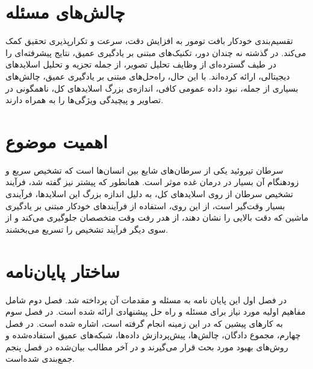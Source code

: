 \section{چالش‌های مسئله}\label{sec:چالش‌های مسئله}
تقسیم‌بندی خودکار بافت تومور به افزایش دقت، سرعت و تکرارپذیری تحقیق کمک می‌کند. در گذشته نه چندان دور، تکنیک‌های مبتنی بر یادگیری عمیق، نتایج پیشرفته‌ای را در طیف گسترده‌ای از وظایف تحلیل تصویر، از جمله تجزیه و تحلیل اسلایدهای دیجیتالی، ارائه کرده‌اند. با این حال، راه‌حل‌های مبتنی بر یادگیری عمیق، چالش‌های بسیاری از جمله، نبود داده عمومی کافی، اندازه‌ی بزرگ اسلاید‌های کل، ناهمگونی در تصاویر و پیچیدگی ویژگی‌ها را به همراه دارند.



\section{اهمیت موضوع}\label{sec:اهمیت موضوع}
سرطان تیروئید یکی از سرطان‌های شایع بین انسان‌ها است که تشخیص سریع و زودهنگام آن بسیار در درمان غده موثر است.
همانطور که پیشتر نیز گفته شد، فرآیند تشخیص سرطان از روی اسلاید‌های کل، به دلیل اندازه بزرگ این اسلایدها، فرآیندی بسیار وقت‌گیر است، از این روی، استفاده از فرآیند‌های خودکار مبتنی بر یادگیری ماشین که دقت بالایی را نشان دهند، از هدر رفت وقت متخصصان جلوگیری می‌کند و از سوی دیگر فرآیند تشخیص را تسریع می‌بخشند.


\section{ساختار پایان‌نامه}\label{sec:ساختار پایان‌نامه}
در فصل اول این پایان نامه به مسئله و مقدمات آن پرداخته شد.
فصل دوم شامل مفاهیم اولیه مورد نیاز برای مسئله و راه حل پیشنهادی ارائه شده است.
در فصل سوم به کارهای پیشین که در این زمینه انجام گرفته است، اشاره شده است.
در فصل چهارم، مجموع دادگان، چالش‌ها، پیش‌پردازش داده‌ها، شبکه‌های عمیق استفاده‌شده و روش‌های بهبود مورد بحث قرار می‌گیرند و در آخر مطالب بیان‌شده در فصل پنجم جمع‌بندی شده‌است.
 


